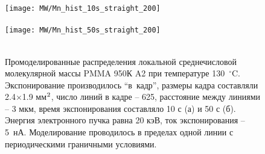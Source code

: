 \begin{figure}[h]
	\begin{center}
		\texttt{[image: MW/Mn\_hist\_10s\_straight\_200]} \\
		\vspace{-3.7em}  \vspace{2.7em} \\
		\texttt{[image: MW/Mn\_hist\_50s\_straight\_200]} \\
		\vspace{-3.7em}  \vspace{3.7em} \\
	\end{center}
	\vspace{-2.5em}
	\caption{
		Промоделированные распределения локальной среднечисловой молекулярной массы PMMA 950К A2 при температуре 130~$^\circ$C.
		Экспонирование производилось ``в~кадр'', размеры кадра составляли 2.4$\times$1.9 мм$^\text{2}$, число линий в кадре -- 625, расстояние между линиями -- 3 мкм, время экспонирования составляло 10 с (а) и 50 с (б).
		Энергия электронного пучка равна 20 кэВ, ток экспонирования -- 5~нА. Моделирование проводилось в пределах одной линии с периодическими граничными условиями.}
	\label{fig:Mn_hist}
\end{figure}
